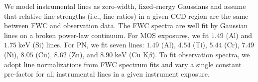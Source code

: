 \documentclass[preprint2,tighten,trackchanges]{aastex6}
\newcommand*{\mt}{\mathrm}
\newcommand*{\unit}[1]{\;\mt{#1}}  %
\begin{document}
We model instrumental lines as zero-width, fixed-energy Gaussians and assume
that relative line strengths (i.e., line ratios) in a given CCD region are the
same between FWC and observation data.
The FWC spectra are well fit by Gaussian lines on a broken power-law continuum.
For MOS exposures, we fit $1.49$ (Al) and $1.75 \unit{keV}$ (Si) lines.
For PN, we fit seven lines: $1.49$ (Al), $4.54$ (Ti), $5.44$ (Cr), $7.49$ (Ni),
$8.05$ (Cu), $8.62$ (Zn), and $8.90 \unit{keV}$ (Cu K$\beta$).
To fit observation spectra, we adopt line normalizations from FWC spectrum fits
and vary a single constant pre-factor for all instrumental lines in a given
instrument exposure.
%
\end{document}
